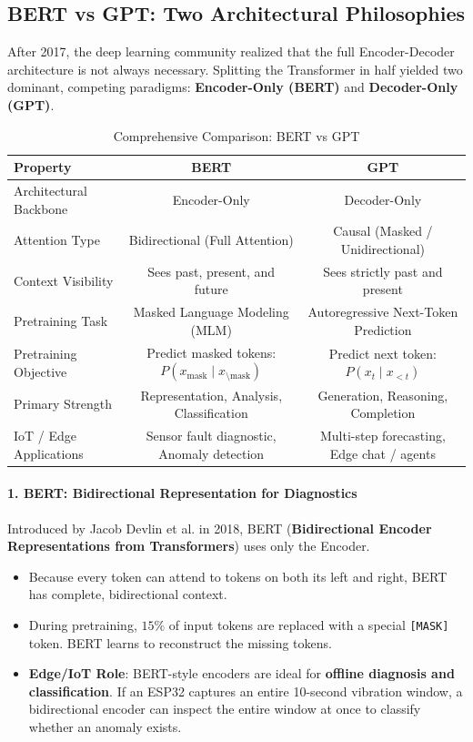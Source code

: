 \subsection{BERT vs GPT: Two Architectural Philosophies}\label{subsec:bert_vs_gpt}

After 2017, the deep learning community realized that the full Encoder-Decoder architecture is not always necessary. Splitting the Transformer in half yielded two dominant, competing paradigms: \textbf{Encoder-Only (BERT)} and \textbf{Decoder-Only (GPT)}.

\begin{table}[htbp]
\centering
\small
\caption{Comprehensive Comparison: BERT vs GPT}\label{tab:bert_vs_gpt}
\begin{tabular}{lcc}
\toprule
\textbf{Property} & \textbf{BERT} & \textbf{GPT} \\
\midrule
Architectural Backbone & Encoder-Only & Decoder-Only \\
Attention Type & Bidirectional (Full Attention) & Causal (Masked / Unidirectional) \\
Context Visibility & Sees past, present, and future & Sees strictly past and present \\
Pretraining Task & Masked Language Modeling (MLM) & Autoregressive Next-Token Prediction \\
Pretraining Objective & Predict masked tokens: $P(x_{\text{mask}} \mid x_{\setminus \text{mask}})$ & Predict next token: $P(x_t \mid x_{<t})$ \\
Primary Strength & Representation, Analysis, Classification & Generation, Reasoning, Completion \\
IoT / Edge Applications & Sensor fault diagnostic, Anomaly detection & Multi-step forecasting, Edge chat / agents \\
\bottomrule
\end{tabular}
\end{table}

\paragraph{1. BERT: Bidirectional Representation for Diagnostics}
Introduced by Jacob Devlin et al. in 2018, BERT (\textbf{Bidirectional Encoder Representations from Transformers}) uses only the Encoder. 
\begin{itemize}
    \item Because every token can attend to tokens on both its left and right, BERT has complete, bidirectional context.
    \item During pretraining, $15\%$ of input tokens are replaced with a special \texttt{[MASK]} token. BERT learns to reconstruct the missing tokens.
    \item \textbf{Edge/IoT Role}: BERT-style encoders are ideal for \textbf{offline diagnosis and classification}. If an ESP32 captures an entire 10-second vibration window, a bidirectional encoder can inspect the entire window at once to classify whether an anomaly exists.
\end{itemize}

